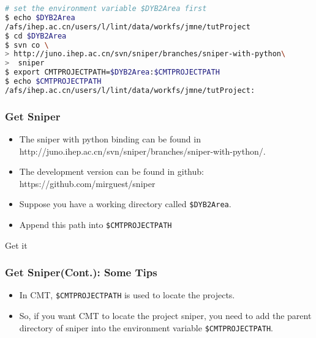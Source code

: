 \newsavebox{\getsniper}
\begin{lrbox}{\getsniper}
\begin{lstlisting}[language=bash]
# set the environment variable $DYB2Area first
$ echo $DYB2Area
/afs/ihep.ac.cn/users/l/lint/data/workfs/jmne/tutProject
$ cd $DYB2Area
$ svn co \
> http://juno.ihep.ac.cn/svn/sniper/branches/sniper-with-python\
>  sniper
$ export CMTPROJECTPATH=$DYB2Area:$CMTPROJECTPATH
$ echo $CMTPROJECTPATH
/afs/ihep.ac.cn/users/l/lint/data/workfs/jmne/tutProject:
\end{lstlisting}
\end{lrbox}

\begin{frame}
    \frametitle{Get Sniper}
    \begin{itemize}
        \item The sniper with python binding can be found
                in http://juno.ihep.ac.cn/svn/sniper/branches/sniper-with-python/.
        \item The development version can be found in github:
                https://github.com/mirguest/sniper
        \item Suppose you have a working directory 
                called {\tt \$DYB2Area}.
        \item Append this path into {\tt \$CMTPROJECTPATH}
    \end{itemize}
    \begin{block}{Get it}
        \par\usebox{\getsniper}
    \end{block}
\end{frame}

\begin{frame}
    \frametitle{Get Sniper(Cont.): Some Tips}
    \begin{itemize}
        \item In CMT, {\tt \$CMTPROJECTPATH}
                is used to locate the projects.
        \item So, if you want CMT to locate the 
                project sniper, you need to add the 
                parent directory of sniper into 
                the environment variable {\tt \$CMTPROJECTPATH}.

    \end{itemize}
\end{frame}
